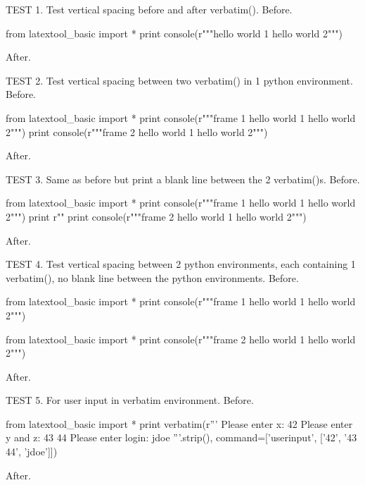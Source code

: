 \newpage

TEST 1. Test vertical spacing before and after verbatim().
Before.
\begin{python}
from latextool_basic import *
print console(r"""hello world 1
hello world 2""")
\end{python}
After.

TEST 2. Test vertical spacing between two verbatim() in 1 python environment.
Before.
\begin{python}
from latextool_basic import *
print console(r"""frame 1
hello world 1
hello world 2""")
print console(r"""frame 2
hello world 1
hello world 2""")
\end{python}
After.

TEST 3. Same as before but print a blank line between the 2 verbatim()s.
Before.
\begin{python}
from latextool_basic import *
print console(r"""frame 1
hello world 1
hello world 2""")
print r"\mbox{}"
print console(r"""frame 2
hello world 1
hello world 2""")
\end{python}
After.

TEST 4. Test vertical spacing between 2 python environments, 
each containing 1 verbatim(), no blank line between the python environments.
Before.
\begin{python}
from latextool_basic import *
print console(r"""frame 1
hello world 1
hello world 2""")
\end{python}
\begin{python}
from latextool_basic import *
print console(r"""frame 2
hello world 1
hello world 2""")
\end{python}
After.


TEST 5. For user input in verbatim environment.
Before.
\begin{python}
from latextool_basic import *
print verbatim(r'''
Please enter x: 42
Please enter y and z: 43 44
Please enter login: jdoe
'''.strip(), command=['userinput', ['42', '43 44', 'jdoe']])
\end{python}
After.


